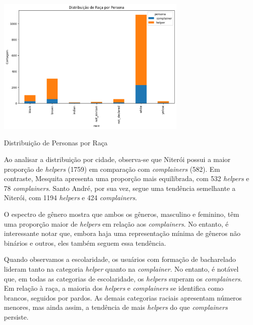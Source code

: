 \begin{quadro}[htb]
    \centering
    \includegraphics[width=0.7\textwidth]{images/persona_race.png}
    \caption{Distribuição de Personas por Raça}
    \label{f
	ig:persona_race}
\end{quadro}

Ao analisar a distribuição por cidade, observa-se que Niterói possui a maior proporção de \textit{helpers} (1759) em comparação com \textit{complainers} (582). Em contraste, Mesquita apresenta uma proporção mais equilibrada, com 532 \textit{helpers} e 78 \textit{complainers}. Santo André, por sua vez, segue uma tendência semelhante a Niterói, com 1194 \textit{helpers} e 424 \textit{complainers}. 

O espectro de gênero mostra que ambos os gêneros, masculino e feminino, têm uma proporção maior de \textit{helpers} em relação aos \textit{complainers}. No entanto, é interessante notar que, embora haja uma representação mínima de gêneros não binários e outros, eles também seguem essa tendência. 

Quando observamos a escolaridade, os usuários com formação de bacharelado lideram tanto na categoria \textit{helper} quanto na \textit{complainer}. No entanto, é notável que, em todas as categorias de escolaridade, os \textit{helpers} superam os \textit{complainers}. Em relação à raça, a maioria dos \textit{helpers} e \textit{complainers} se identifica como brancos, seguidos por pardos. As demais categorias raciais apresentam números menores, mas ainda assim, a tendência de mais \textit{helpers} do que \textit{complainers} persiste.

